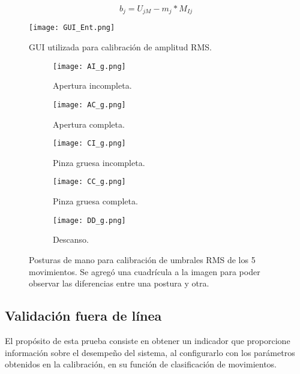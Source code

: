 \begin{equation}
	b_{j} = U_{jM} - m_{j}*M_{Ij}
	\label{Ecu: b}
\end{equation}

\begin{figure}[htb]
	\centering
	\texttt{[image: GUI\_Ent.png]}
	\caption{GUI utilizada para calibración de amplitud RMS.}
	\label{Figura: GUI_Ent}
\end{figure}

\begin{figure}[htbp]
	\centering
	\begin{subfigure}[htbp]{0.4\textwidth}
		\texttt{[image: AI\_g.png]}
		\caption{Apertura incompleta.}
		\label{Figura: AI}
	\end{subfigure}
	\begin{subfigure}[htbp]{0.4\textwidth}
		\texttt{[image: AC\_g.png]}
		\caption{Apertura completa.}
		\label{Figura: AC}
	\end{subfigure}
	\newline
	\begin{subfigure}[htbp]{0.4\textwidth}
		\texttt{[image: CI\_g.png]}
		\caption{Pinza gruesa incompleta.}
		\label{Figura: CI}
	\end{subfigure}
	\begin{subfigure}[htbp]{0.4\textwidth}
		\texttt{[image: CC\_g.png]}
		\caption{Pinza gruesa completa.}
		\label{Figura: CC}
	\end{subfigure}
	\newline
	\begin{subfigure}[htbp]{0.4\textwidth}
		\texttt{[image: DD\_g.png]}
		\caption{Descanso.}
		\label{Figura: DD}
	\end{subfigure}
	\caption[Posturas de mano para calibración de umbrales RMS]{Posturas de mano para calibración de umbrales RMS de los 5 movimientos. Se agregó una cuadrícula a la imagen para poder observar las diferencias entre una postura y otra.}
	\label{Figura: Posturas}
\end{figure}

\subsection{Validación fuera de línea}
El propósito de esta prueba consiste en obtener un indicador que proporcione información sobre el desempeño del sistema, al configurarlo con los parámetros obtenidos en la calibración, en su función de clasificación de movimientos.

